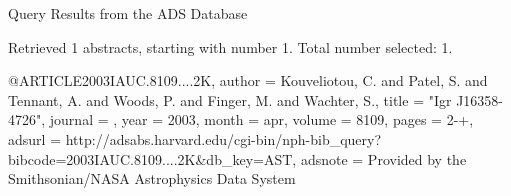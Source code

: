 Query Results from the ADS Database


Retrieved 1 abstracts, starting with number 1.  Total number selected: 1.

@ARTICLE{2003IAUC.8109....2K,
   author = {{Kouveliotou}, C. and {Patel}, S. and {Tennant}, A. and {Woods}, P. and 
	{Finger}, M. and {Wachter}, S.},
    title = "{Igr J16358-4726}",
  journal = {\iaucirc},
     year = 2003,
    month = apr,
   volume = 8109,
    pages = {2-+},
   adsurl = {http://adsabs.harvard.edu/cgi-bin/nph-bib_query?bibcode=2003IAUC.8109....2K&db_key=AST},
  adsnote = {Provided by the Smithsonian/NASA Astrophysics Data System}
}


